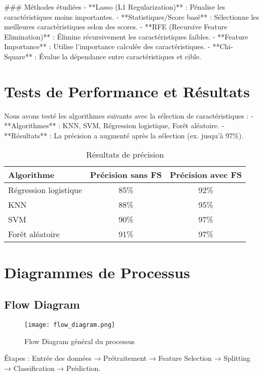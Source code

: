 \documentclass{article}
\begin{document}
### Méthodes étudiées
- **Lasso (L1 Regularization)** : Pénalise les caractéristiques moins importantes.  
- **Statistiques/Score basé** : Sélectionne les meilleures caractéristiques selon des scores.  
- **RFE (Recursive Feature Elimination)** : Élimine récursivement les caractéristiques faibles.  
- **Feature Importance** : Utilise l'importance calculée des caractéristiques.  
- **Chi-Square** : Évalue la dépendance entre caractéristiques et cible.

\section{Tests de Performance et Résultats}
Nous avons testé les algorithmes suivants avec la sélection de caractéristiques :
- **Algorithmes** : KNN, SVM, Régression logistique, Forêt aléatoire.  
- **Résultats** : La précision a augmenté après la sélection (ex. jusqu'à 97\%).

\begin{table}[h]
    \centering
    \begin{tabular}{|l|c|c|}
        \hline
        \textbf{Algorithme} & \textbf{Précision sans FS} & \textbf{Précision avec FS} \\
        \hline
        Régression logistique & 85\% & 92\% \\
        \hline
        KNN & 88\% & 95\% \\
        \hline
        SVM & 90\% & 97\% \\
        \hline
        Forêt aléatoire & 91\% & 97\% \\
        \hline
    \end{tabular}
    \caption{Résultats de précision}
    \label{tab:results}
\end{table}

\section{Diagrammes de Processus}
\subsection{Flow Diagram}
\begin{figure}[h]
    \centering
    \texttt{[image: flow\_diagram.png]}
    \caption{Flow Diagram général du processus}
    \label{fig:flow_diagram}
\end{figure}
Étapes : Entrée des données → Prétraitement → Feature Selection → Splitting → Classification → Prédiction.
\end{document}
